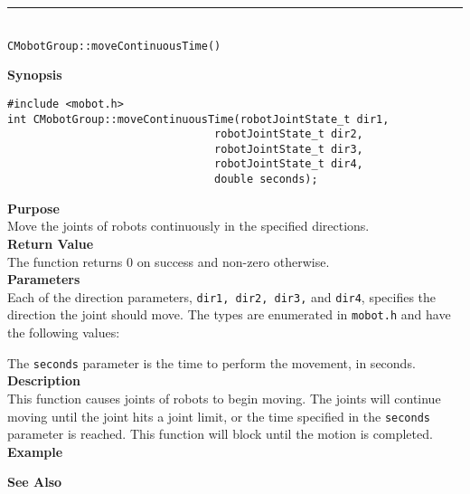 \noindent
\vspace{5pt}
\rule{4.5in}{0.015in}\\
\noindent
{\LARGE \texttt{CMobotGroup::moveContinuousTime()}}\\
{}

\noindent
{\bf Synopsis}
\vspace{-8pt}
\begin{verbatim}
#include <mobot.h>
int CMobotGroup::moveContinuousTime(robotJointState_t dir1, 
                                robotJointState_t dir2, 
                                robotJointState_t dir3, 
                                robotJointState_t dir4, 
                                double seconds);
\end{verbatim}

\noindent
{\bf Purpose}\\
Move the joints of robots continuously in the specified directions.\\

\noindent
{\bf Return Value}\\
The function returns 0 on success and non-zero otherwise.\\

\noindent
{\bf Parameters}\\
Each of the direction parameters, \texttt{dir1, dir2, dir3,} and \texttt{dir4}, specifies the direction the joint should move. The types
are enumerated in \texttt{mobot.h} and have the following values:

The \texttt{seconds} parameter is the time to perform the movement, in seconds.
\\

\noindent
{\bf Description}\\
This function causes joints of robots to begin moving. The joints will continue moving
until the joint hits a joint limit, or the time specified in the \texttt{seconds} parameter
is reached. This function will block until the motion is completed.\\

\noindent
{\bf Example}\\
\noindent

\noindent
{\bf See Also}\\

